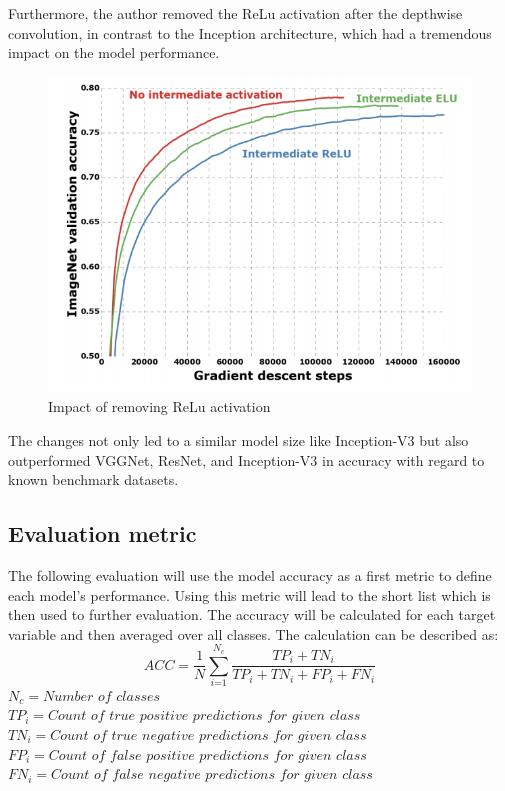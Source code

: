 Furthermore, the author removed the ReLu activation after the depthwise convolution, in contrast to the Inception architecture, which had a tremendous impact on the model performance.
\begin{figure}
  \centering
  \includegraphics[width=\linewidth]{figures/xception_activation.png}
  \caption{Impact of removing ReLu activation\cite{chollet2017xception}}
  \label{xception_activation}
\end{figure}

The changes not only led to a similar model size like Inception-V3 but also outperformed  VGGNet, ResNet, and Inception-V3 in accuracy with regard to known benchmark datasets\cite{chollet2017xception}.

\subsection{Evaluation metric}

The following evaluation will use the model accuracy as a first metric to define each model's performance. Using this metric will lead to the short list which is then used to further evaluation. The accuracy will be calculated for each target variable and then averaged over all classes. The calculation can be described as:
\begin{equation}
ACC=\frac{1}{N} \sum_\textit{i=1}^{N_\textit{c}} \displaystyle\frac{TP_{\textit{i}}+TN_{\textit{i}}}{TP_{\textit{i}}+TN_{\textit{i}}+FP_{\textit{i}}+FN_{\textit{i}}}
\end{equation}
\break
$N_\textit{c}=\textit{Number of classes}$\\
$TP_\textit{i} = \textit{Count of true positive predictions for given class}$\\
$TN_\textit{i} = \textit{Count of true negative predictions for given class}$\\
$FP_\textit{i} = \textit{Count of false positive predictions for given class}$\\
$FN_\textit{i} = \textit{Count of false negative predictions for given class}$

